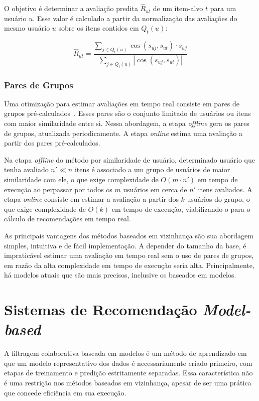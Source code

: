 O objetivo é determinar a avaliação predita $\hat{R}_{ut}$ de um item-alvo $t$ para um usuário
$u$. Esse valor é calculado a partir da normalização das avaliações do mesmo
usuário $u$ sobre os itens contidos em $Q_t (u)$:

\begin{equation}
    \hat{R}_{ut} = \frac{\sum_{j \in Q_t(u)} \cos(s_{uj},s_{ut}) \cdot s_{uj}}{\sum_{j \in Q_t(u)} |\cos(s_{uj},s_{ut})|}
\end{equation}

\subsubsection{Pares de Grupos}

Uma otimização para estimar avaliações em tempo real consiste em pares de grupos
pré-calculados~\cite{aggarwal2016recommender}. Esses pares são o conjunto limitado de usuários ou itens com
maior similaridade entre si. Nessa abordagem, a etapa \textit{offline} gera os
pares de grupos, atualizada periodicamente. A etapa \textit{online} estima uma
avaliação a partir dos pares pré-calculados.

Na etapa \textit{offline} do método por similaridade de usuário, determinado
usuário que tenha avaliado $n' \ll n$ itens é associado a um grupo de usuários
de maior similaridade com ele, o que exige complexidade de $O(m \cdot n')$ em
tempo de execução ao perpassar por todos os $m$ usuários em cerca de $n'$ itens
avaliados. A etapa \textit{online} consiste em estimar a avaliação a partir dos
$k$ usuários do grupo, o que exige complexidade de $O(k)$ em tempo de execução,
viabilizando-o para o cálculo de recomendações em tempo real.
 
As principais vantagens dos métodos baseados em vizinhança são sua abordagem
simples, intuitiva e de fácil implementação. A depender do tamanho da base, é
impraticável estimar uma avaliação em tempo real sem o uso de pares de grupos,
em razão da alta complexidade em tempo de execução seria alta. Principalmente,
há modelos atuais que são mais precisos, inclusive os baseados em modelos.

\section{Sistemas de Recomendação \textit{Model-based}}
A filtragem colaborativa baseada em modelos é um método de aprendizado em que um
modelo representativo dos dados é necessariamente criado primeiro, com etapas de
treinamento e predição estritamente separadas. Essa característica  não é uma
restrição nos métodos baseados em vizinhança, apesar de ser uma prática que
concede eficiência em sua execução.


